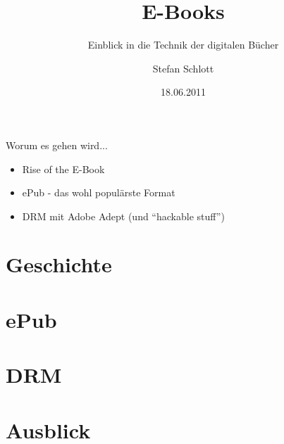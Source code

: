 \documentclass[hyperref={pdfpagelabels=false}]{beamer}
\title{E-Books}
\subtitle{Einblick in die Technik der digitalen Bücher}
\author{%
		Stefan Schlott%
}
\institute{%
	Web: \url{http://stefan.ploing.de/} \\
	Twitter: \href{https://twitter.com/\_skyr}{@\_skyr}
}
\date{18.06.2011}
\begin{document}
\begin{frame}[plain]
\titlepage
\end{frame}


\begin{frame}{Worum es gehen wird...}
	\begin{itemize}
		\item Rise of the E-Book
		\item ePub - das wohl populärste Format
		\item DRM mit Adobe Adept (und "`hackable stuff"')
	\end{itemize}
\end{frame}


\section{Geschichte}



\section{ePub}








\section{DRM}




\section{Ausblick}
\end{document}
